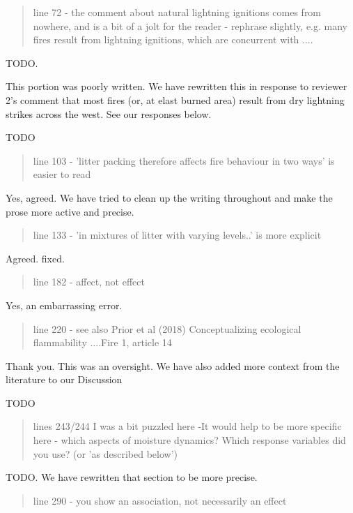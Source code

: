 \documentclass[letterpaper, 12pt]{letter}
\begin{document}
\begin{letter}{}
\begin{quote}
line 72 - the comment about natural lightning ignitions comes from nowhere, and is a  bit of a jolt for the reader - rephrase slightly, e.g. many fires result from lightning ignitions, which are concurrent with ....
\end{quote}

TODO.

This portion was poorly written. We have rewritten this in response to reviewer 2's comment that most fires (or, at elast burned area) result from dry lightning strikes across the west. See our responses below.

TODO


\begin{quote}
line 103 - 'litter packing therefore affects fire behaviour in two ways' is easier to read
\end{quote}

Yes, agreed. We have tried to clean up the writing throughout and make the prose more active and precise.

\begin{quote}
line 133 - 'in mixtures of litter with varying levels..' is more explicit
\end{quote}

Agreed. fixed.

\begin{quote}
line 182 - affect, not effect
\end{quote}

Yes, an embarrassing error.


\begin{quote}
line 220 - see also Prior et al (2018)  Conceptualizing ecological flammability ....Fire 1, article 14
\end{quote}

Thank you. This was an oversight. We have also added more context from the
literature to our Discussion

TODO

\begin{quote}
lines 243/244 I was a bit puzzled here -It would help to be more specific here - which aspects of moisture dynamics? Which response variables did you use?  (or 'as described below')
\end{quote}

TODO. We have rewritten that section to be more precise.

\begin{quote}
line 290 - you show an association, not necessarily an effect
\end{quote}


\end{letter}
\end{document}
